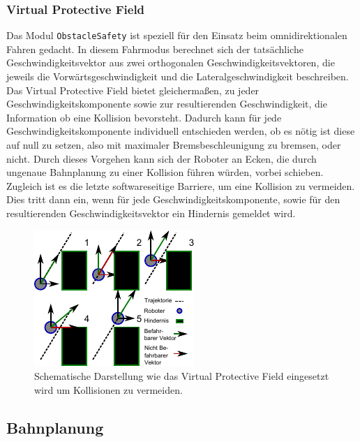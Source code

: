 \subsubsection{Virtual Protective Field}
\label{bahnplanung_virtual_protective_field_sec}

Das Modul \lstinline{ObstacleSafety} ist speziell für den Einsatz beim omnidirektionalen Fahren gedacht. In diesem Fahrmodus berechnet sich der tatsächliche Geschwindigkeitsvektor aus zwei orthogonalen Geschwindigkeitsvektoren, die jeweils die Vorwärtsgeschwindigkeit und die Lateralgeschwindigkeit beschreiben. Das Virtual Protective Field bietet gleichermaßen, zu jeder Geschwindigkeitskomponente sowie zur resultierenden Geschwindigkeit, die Information ob eine Kollision bevorsteht. Dadurch kann für jede Geschwindigkeitskomponente individuell entschieden werden, ob es nötig ist diese auf null zu setzen, also mit maximaler Bremsbeschleunigung zu bremsen, oder nicht. Durch dieses Vorgehen kann sich der Roboter an Ecken, die durch ungenaue Bahnplanung zu einer Kollision führen würden, vorbei schieben. Zugleich ist es die letzte softwareseitige Barriere, um eine Kollision zu vermeiden. Dies tritt dann ein, wenn für jede Geschwindigkeitskomponente, sowie für den resultierenden Geschwindigkeitsvektor ein Hindernis gemeldet wird.

\begin{figure}
	\label{fig:bahnplanung_umsetzung_vpf}
	\centering
	\includegraphics[scale=2]{graphics/SCHEMA-vpf.pdf}
	\caption[Einsatz des Virtual Protective Fields]{Schematische Darstellung wie das Virtual Protective Field eingesetzt wird um Kollisionen zu vermeiden.}
\end{figure}

\subsection{Bahnplanung}
\label{bahnplanung_subsec}
\authorsection{\editortobias}


